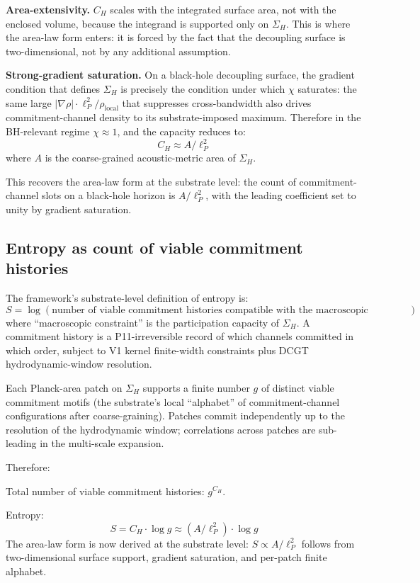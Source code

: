 \documentclass[11pt,a4paper]{article}
\begin{document}
\textbf{Area-extensivity.} $C_H$ scales with the integrated surface area, not with the enclosed volume, because the integrand is supported only on $\Sigma_H$. This is where the area-law form enters: it is forced by the fact that the decoupling surface is two-dimensional, not by any additional assumption.

\textbf{Strong-gradient saturation.} On a black-hole decoupling surface, the gradient condition that defines $\Sigma_H$ is precisely the condition under which $\chi$ saturates: the same large $|\nabla\rho|\cdot\ell_P^2/\rho_{\mathrm{local}}$ that suppresses cross-bandwidth also drives commitment-channel density to its substrate-imposed maximum. Therefore in the BH-relevant regime $\chi \approx 1$, and the capacity reduces to:
\[
C_H \approx A / \ell_P^{2}
\]
where $A$ is the coarse-grained acoustic-metric area of $\Sigma_H$.

This recovers the area-law form at the substrate level: the count of commitment-channel slots on a black-hole horizon is $A/\ell_P^2$, with the leading coefficient set to unity by gradient saturation.

\subsection{Entropy as count of viable commitment histories}

The framework's substrate-level definition of entropy is:
\[
S = \log(\text{number of viable commitment histories compatible with the macroscopic constraint})
\]
where ``macroscopic constraint'' is the participation capacity of $\Sigma_H$. A commitment history is a P11-irreversible record of which channels committed in which order, subject to V1 kernel finite-width constraints plus DCGT hydrodynamic-window resolution.

Each Planck-area patch on $\Sigma_H$ supports a finite number $g$ of distinct viable commitment motifs (the substrate's local ``alphabet'' of commitment-channel configurations after coarse-graining). Patches commit independently up to the resolution of the hydrodynamic window; correlations across patches are sub-leading in the multi-scale expansion.

Therefore:

Total number of viable commitment histories: $g^{C_H}$.

Entropy:
\[
S = C_H \cdot \log g \approx (A/\ell_P^{2}) \cdot \log g
\]
The area-law form is now derived at the substrate level: $S \propto A/\ell_P^2$ follows from two-dimensional surface support, gradient saturation, and per-patch finite alphabet.
\end{document}
